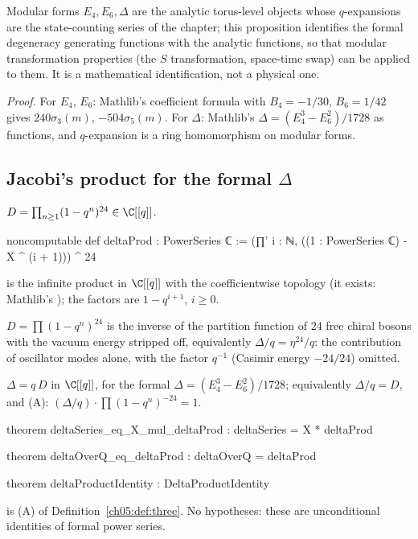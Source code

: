 \begin{physics}
Modular forms $E_4,E_6,\Delta$ are the analytic torus-level objects whose $q$-expansions are the state-counting series of the chapter; this proposition identifies the formal degeneracy generating functions with the analytic functions, so that modular transformation properties (the $S$ transformation, space-time swap) can be applied to them. It is a mathematical identification, not a physical one.
\end{physics}
\noindent\emph{Proof.} For $E_4$, $E_6$: Mathlib's coefficient formula with $B_4 = -1/30$, $B_6 = 1/42$
gives $240\sigma_3(m)$, $-504\sigma_5(m)$. For $\Delta$: Mathlib's $\Delta = (E_4^3 - E_6^2)/1728$ as functions,
and $q$-expansion is a ring homomorphism on modular forms.

\subsection{Jacobi's product for the formal \texorpdfstring{$\Delta$}{Delta}}

\begin{definition}
$D = \prod_{n\ge1}(1-q^n)^{24}\in\C[[q]]$.
\end{definition}
\begin{leancode}
noncomputable def deltaProd : PowerSeries ℂ := (∏' i : ℕ, ((1 : PowerSeries ℂ) - X ^ (i + 1))) ^ 24
\end{leancode}
\begin{dictionary}
 is the infinite product in $\C[[q]]$ with the coefficientwise topology (it exists:
Mathlib's ); the factors are $1 - q^{i+1}$, $i\ge0$.
\end{dictionary}

\begin{physics}
$D=\prod(1-q^n)^{24}$ is the inverse of the partition function of $24$ free chiral bosons with the vacuum energy stripped off, equivalently $\Delta/q=\eta^{24}/q$: the contribution of oscillator modes alone, with the factor $q^{-1}$ (Casimir energy $-24/24$) omitted.
\end{physics}

\begin{theorem}\label{ch05:thm:deltaprod}
$\Delta = q\,D$ in $\C[[q]]$, for the formal $\Delta = (E_4^3-E_6^2)/1728$; equivalently $\Delta/q = D$, and
(A): $(\Delta/q)\cdot\prod(1-q^n)^{-24} = 1$.
\end{theorem}
\begin{leancode}
theorem deltaSeries_eq_X_mul_deltaProd : deltaSeries = X * deltaProd

theorem deltaOverQ_eq_deltaProd : deltaOverQ = deltaProd

theorem deltaProductIdentity : DeltaProductIdentity
\end{leancode}
\begin{dictionary}
 is (A) of Definition~\ref{ch05:def:three}. No hypotheses: these are
unconditional identities of formal power series.
\end{dictionary}

